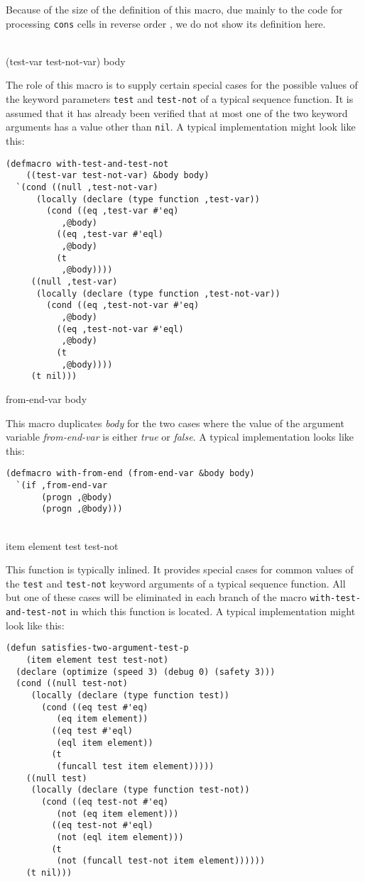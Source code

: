 Because of the size of the definition of this macro, due mainly to the
code for processing \texttt{cons} cells in reverse order
\cite{Durand:2015:ELS:reverse}, we do not show its definition here.

\\
{(test-var test-not-var) \body body}

The role of this macro is to supply certain special cases for the
possible values of the keyword parameters \texttt{test} and
\texttt{test-not} of a typical sequence function.  It is assumed that
it has already been verified that at most one of the two keyword
arguments has a value other than \texttt{nil}.  A typical
implementation might look like this:

{\small\begin{verbatim}
(defmacro with-test-and-test-not
    ((test-var test-not-var) &body body)
  `(cond ((null ,test-not-var)
	  (locally (declare (type function ,test-var))
	    (cond ((eq ,test-var #'eq)
		   ,@body)
		  ((eq ,test-var #'eql)
		   ,@body)
		  (t
		   ,@body))))
	 ((null ,test-var)
	  (locally (declare (type function ,test-not-var))
	    (cond ((eq ,test-not-var #'eq)
		   ,@body)
		  ((eq ,test-not-var #'eql)
		   ,@body)
		  (t
		   ,@body))))
	 (t nil)))
\end{verbatim}}

 {from-end-var \body body}

This macro duplicates \textit{body} for the two cases where the value
of the argument variable \textit{from-end-var} is either \emph{true}
or \emph{false}.  A typical implementation looks like this:

{\small\begin{verbatim}
(defmacro with-from-end (from-end-var &body body)
  `(if ,from-end-var
       (progn ,@body)
       (progn ,@body)))
\end{verbatim}}

\\
{item element test test-not}

This function is typically inlined.  It provides special cases for
common values of the \texttt{test} and \texttt{test-not} keyword
arguments of a typical sequence function.  All but one of these cases
will be eliminated in each branch of the macro
\texttt{with-test-and-test-not} in which this function is located.  A
typical implementation might look like this:

{\small\begin{verbatim}
(defun satisfies-two-argument-test-p
    (item element test test-not)
  (declare (optimize (speed 3) (debug 0) (safety 3)))
  (cond ((null test-not)
	 (locally (declare (type function test))
	   (cond ((eq test #'eq)
		  (eq item element))
		 ((eq test #'eql)
		  (eql item element))
		 (t
		  (funcall test item element)))))
	((null test)
	 (locally (declare (type function test-not))
	   (cond ((eq test-not #'eq)
		  (not (eq item element)))
		 ((eq test-not #'eql)
		  (not (eql item element)))
		 (t
		  (not (funcall test-not item element))))))
	(t nil)))
\end{verbatim}}

